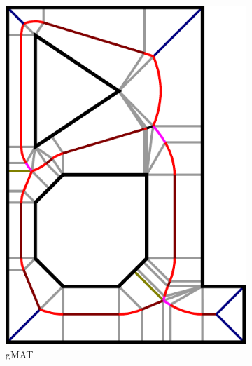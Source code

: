 \begin{figure}
\begin{subfigure}{0.24\columnwidth}
\includegraphics[width=\columnwidth]{sources/method/gMAT_example.pdf}
\caption{gMAT}
\end{subfigure}
\begin{subfigure}{0.24\columnwidth}

\end{subfigure}
\end{figure}
